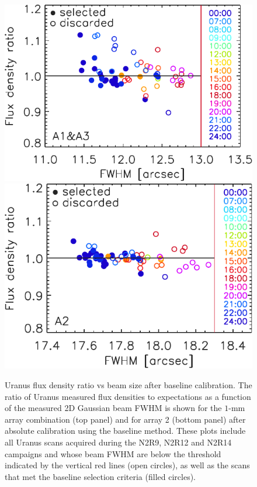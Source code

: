\begin{figure}[!htbp]
\begin{center}
\includegraphics[clip=true, trim={0, -0.3cm, -0.3cm, 0}, width=0.72\linewidth]{Figures/plot_flux_density_ratio_fwhm_uranus_corrected_skydip_narrow_1mm.pdf}
\includegraphics[clip=true, trim={0cm, -0.3cm, -0.6cm, 0}, width=0.707\linewidth]{Figures/plot_flux_density_ratio_fwhm_uranus_corrected_skydip_narrow_a2.pdf}
  
\caption[Uranus flux density stability against FWHM]{ Uranus flux
density ratio vs beam size after baseline calibration. The ratio
of Uranus measured flux densities to expectations as a function of the
measured 2D Gaussian beam FWHM is shown for the $1$-mm array
combination (top panel) and for array 2 (bottom panel) after absolute calibration using the
baseline method. These plots include all Uranus scans acquired during the 
N2R9, N2R12 and N2R14 campaigns and whose beam FWHM are below the threshold indicated
by the vertical red lines (open circles), as well as the scans that
met the baseline selection criteria (filled circles).}
\label{fig:calib_uranus_vs_fwhm_all}
\end{center}
\end{figure}

